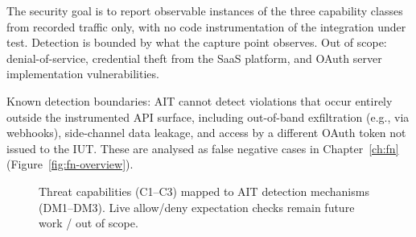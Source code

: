 \documentclass[12pt,a4paper]{report}
\begin{document}
The security goal is to report observable instances of the three capability classes from
recorded traffic only, with no code instrumentation of the integration under test. Detection is
bounded by what the capture point observes. Out of scope: denial-of-service, credential
theft from the SaaS platform, and OAuth server implementation vulnerabilities.

Known detection boundaries: AIT cannot detect violations that occur entirely outside the
instrumented API surface, including out-of-band exfiltration (e.g., via webhooks), side-channel
data leakage, and access by a different OAuth token not issued to the IUT. These are analysed as
false negative cases in Chapter~\ref{ch:fn} (Figure~\ref{fig:fn-overview}).

\begin{figure}[H]
    \centering
    \caption{Threat capabilities (C1--C3) mapped to AIT detection mechanisms (DM1--DM3).
             Live allow/deny expectation checks remain future work / out of scope.}
    \label{fig:threat-map}
\end{figure}
\end{document}
